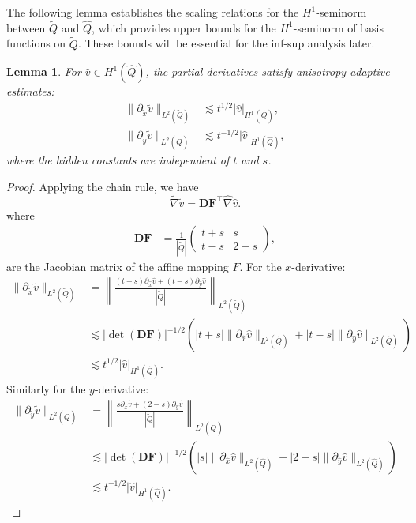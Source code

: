 \documentclass[a4paper,11pt,fleqn]{article}
\newtheorem{lemma}[theorem]{Lemma}
\numberwithin{equation}{section}
\begin{document}
The following lemma establishes the scaling relations for the $H^1$-seminorm between $\tilde{Q}$ and $\hat{Q}$, which provides upper bounds for the $H^1$-seminorm of basis functions on $\tilde{Q}$. These bounds will be essential for the inf-sup analysis later.

\begin{lemma}\label{lem:affine-est}
	For $\hat{v} \in H^1(\hat{Q})$, the partial derivatives satisfy anisotropy-adaptive estimates:
	\begin{align}
		\|\partial_{\tilde{x}} \tilde{v}\|_{L^2(\tilde{Q})} &\lesssim t^{1/2} |\hat{v}|_{H^1(\hat{Q})}, \\
		\|\partial_{\tilde{y}} \tilde{v}\|_{L^2(\tilde{Q})} &\lesssim t^{-1/2} |\hat{v}|_{H^1(\hat{Q})},
	\end{align}
	where the hidden constants are independent of $t$ and $s$.
\end{lemma}
\begin{proof}
	Applying the chain rule, we have
	\begin{equation}
		\tilde{\nabla} \tilde{v} = \bm{D\!F}^\top \hat{\nabla} \hat{v}.
	\end{equation}
	where 
	\begin{align}
		\bm{D\!F} &= \frac{1}{|\tilde{Q}|} \begin{pmatrix}
				t + s & s \\
				t - s & 2 - s
			\end{pmatrix}, \label{eq:jacobian} 
	\end{align}
	are the Jacobian matrix of the affine mapping $F$. For the $x$-derivative:
	\begin{align*}
		\|\partial_{\tilde{x}} \tilde{v}\|_{L^2(\tilde{Q})} 
		&= \left\| \frac{(t + s)\partial_{\hat{x}} \hat{v} + (t - s)\partial_{\hat{y}} \hat{v}}{|\tilde{Q}|} \right\|_{L^2(\tilde{Q})} \\
		&\lesssim |\det(\bm{D\!F})|^{-1/2} \left( |t + s| \|\partial_{\hat{x}} \hat{v}\|_{L^2(\hat{Q})} + |t - s| \|\partial_{\hat{y}} \hat{v}\|_{L^2(\hat{Q})} \right) \\
		&\lesssim t^{1/2} |\hat{v}|_{H^1(\hat{Q})}.
	\end{align*}
	Similarly for the $y$-derivative:
	\begin{align*}
		\|\partial_{\tilde{y}} \tilde{v}\|_{L^2(\tilde{Q})} 
		&= \left\| \frac{s\partial_{\hat{x}} \hat{v} + (2 - s)\partial_{\hat{y}} \hat{v}}{|\tilde{Q}|} \right\|_{L^2(\tilde{Q})} \\
		&\lesssim |\det(\bm{D\!F})|^{-1/2} \left( |s| \|\partial_{\hat{x}} \hat{v}\|_{L^2(\hat{Q})} + |2 - s| \|\partial_{\hat{y}} \hat{v}\|_{L^2(\hat{Q})} \right) \\
		&\lesssim t^{-1/2} |\hat{v}|_{H^1(\hat{Q})}.
	\end{align*}
\end{proof}
\end{document}
